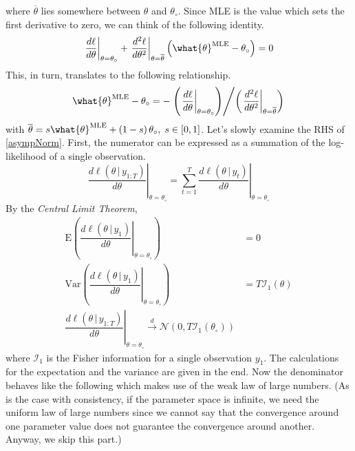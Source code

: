 \documentclass[answers]{exam}
\begin{document}
\begin{questions}
\begin{solution}
\begin{enumerate}[a)]
\begin{itemize}
\begin{equation}
      \end{equation}
      where $\overline{\theta}$ lies somewhere between $\theta$ and $\theta_{\circ}$. Since MLE is the value which sets the first derivative to zero, we can think of the following identity.
      \begin{equation}
        \left.\dfrac{d\ell}{d\theta}\right|_{\theta=\theta_{\circ}}+\left.\dfrac{d^{2}\ell}{d\theta^{2}}\right|_{\theta=\overline{\theta}}\left(\what{\theta}^{\text{MLE}}-\theta_{\circ}\right)=0
      \end{equation}
      This, in turn, translates to the following relationship.
      \begin{equation}\label{asympNorm}
        \what{\theta}^{\text{MLE}}-\theta_{\circ} =-\left.\left(\left.\dfrac{d\ell}{d\theta}\right|_{\theta=\theta_{\circ}}\right)\middle/\left(\left.\dfrac{d^{2}\ell}{d\theta^{2}}\right|_{\theta=\overline{\theta}}\right)\right.
      \end{equation}
      with $\overline{\theta} = s\what{\theta}^{\text{MLE}}+\left(1-s\right)\theta_{\circ},\; s\in\left[0,1\right]$. Let's slowly examine the RHS of \ref{asympNorm}. First, the numerator can be expressed as a summation of the log-likelihood of a single observation.
      \begin{equation}
        \left.\dfrac{d\ell\left(\theta\,|\,y_{1:T}\right)}{d\theta}\right|_{\theta=\theta_{\circ}} = \sum_{t=1}^{T}\left.\dfrac{d\ell\left(\theta\,|\,y_{t}\right)}{d\theta}\right|_{\theta=\theta_{\circ}}
      \end{equation}
      By the \emph{Central Limit Theorem},
      \begin{align}\label{CLT}
        \mathrm{E}\left(\left.\dfrac{d\ell\left(\theta\,|\,y_{1}\right)}{d\theta}\right|_{\theta=\theta_{\circ}}\right) &= 0\\
        \mathrm{Var}\left(\left.\dfrac{d\ell\left(\theta\,|\,y_{1}\right)}{d\theta}\right|_{\theta=\theta_{\circ}}\right) &= T\mathcal{I}_{1}\left(\theta\right)\\
        \left.\dfrac{d\ell\left(\theta\,|\,y_{1:T}\right)}{d\theta}\right|_{\theta=\theta_{\circ}} \xrightarrow{d} \mathcal{N}\left(0,T\mathcal{I}_{1}\left(\theta_{\circ}\right)\right)
      \end{align}
      where $\mathcal{I}_{1}$ is the Fisher information for a single observation $y_{1}$. The calculations for the expectation and the variance are given in the end. Now the denominator behaves like the following which makes use of the weak law of large numbers. (As is the case with consistency, if the parameter space is infinite, we need the uniform law of large numbers since we cannot say that the convergence around one parameter value does not guarantee the convergence around another. Anyway, we skip this part.)

\end{itemize}
\end{enumerate}
\end{solution}
\end{questions}
\end{document}
